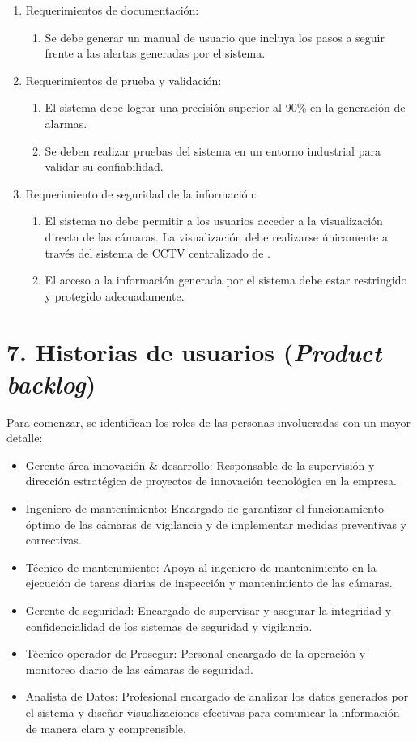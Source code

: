 \documentclass[
11pt, %
]{charter}
\begin{document}
\begin{enumerate}
	\item Requerimientos de documentación:
		\begin{enumerate}
			\item Se debe generar un manual de usuario que incluya los pasos a seguir frente a las alertas generadas por el sistema.
		\end{enumerate}
	\item Requerimientos de prueba y validación:
		\begin{enumerate}
			\item El sistema debe lograr una precisión superior al 90\% en la generación de alarmas.
			\item Se deben realizar pruebas del sistema en un entorno industrial para validar su confiabilidad.
		\end{enumerate}
	\item Requerimiento de seguridad de la información:
		\begin{enumerate}
			\item El sistema no debe permitir a los usuarios acceder a la visualización directa de las cámaras. La visualización debe realizarse únicamente a través del sistema de CCTV centralizado de \empclientename.
			\item El acceso a la información generada por el sistema debe estar restringido y protegido adecuadamente.
		\end{enumerate}
\end{enumerate}

\section{7. Historias de usuarios (\textit{Product backlog})}
\label{sec:backlog}

Para comenzar, se identifican los roles de las personas involucradas con un mayor detalle:

\begin{itemize}
	\item Gerente área innovación \& desarrollo: Responsable de la supervisión y dirección estratégica de proyectos de innovación tecnológica en la empresa.
	\item Ingeniero de mantenimiento: Encargado de garantizar el funcionamiento óptimo de las cámaras de vigilancia y de implementar medidas preventivas y correctivas.
	\item Técnico de mantenimiento: Apoya al ingeniero de mantenimiento en la ejecución de tareas diarias de inspección y mantenimiento de las cámaras.
	\item Gerente de seguridad: Encargado de supervisar y asegurar la integridad y confidencialidad de los sistemas de seguridad y vigilancia.
	\item Técnico operador de Prosegur: Personal encargado de la operación y monitoreo diario de las cámaras de seguridad.
	\item Analista de Datos: Profesional encargado de analizar los datos generados por el sistema y diseñar visualizaciones efectivas para comunicar la información de manera clara y comprensible.
\end{itemize}
\end{document}
